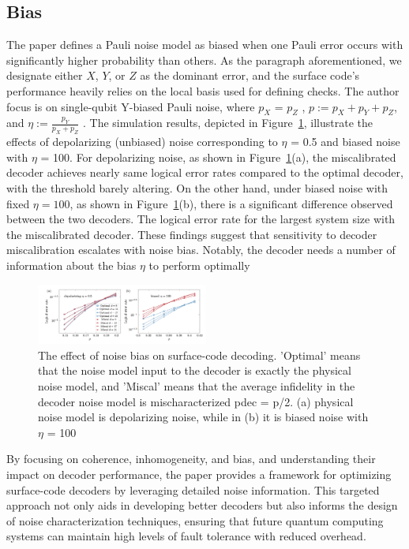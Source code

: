 \subsection{Bias}

The paper defines a Pauli noise model as biased when one Pauli error occurs with significantly higher probability than others. As the paragraph aforementioned, we designate either $X$, $Y$, or $Z$ as the dominant error, and the surface code's performance heavily relies on the local basis used for defining checks. The author focus is on single-qubit Y-biased Pauli noise, where $p_X$ = $p_Z$ , $p := p_X +p_Y +p_Z$, and $\eta := \frac{p_Y}{p_X + p_Z}$ . The simulation results, depicted in Figure~\ref{fig:eta}, illustrate the effects of depolarizing (unbiased) noise corresponding to $\eta$ = 0.5 and biased noise with $\eta$ = 100. For depolarizing noise, as shown in Figure~\ref{fig:eta}(a), the miscalibrated decoder achieves nearly same logical error rates compared to the optimal decoder, with the threshold barely altering. On the other hand, under biased noise with fixed $\eta = 100$, as shown in Figure~\ref{fig:eta}(b), there is a significant difference observed between the two decoders. The logical error rate for the largest system size with the miscalibrated decoder. These findings suggest that sensitivity to decoder miscalibration escalates with noise bias. Notably, the decoder needs a number of information about the bias $\eta$ to perform optimally
\begin{figure}[h]
    \centering
    \includegraphics[width=0.5\textwidth]{sections/3_decoder/eta.png}
    \caption{The effect of noise bias on surface-code decoding. 'Optimal' means that the noise model input to the decoder is exactly the physical noise model, and 'Miscal' means that the average infidelity in the decoder noise model is mischaracterized pdec = p/2. (a) physical noise model is depolarizing noise, while in (b) it is biased noise with $\eta$ = 100}
    \label{fig:eta}
\end{figure}

By focusing on coherence, inhomogeneity, and bias, and understanding their impact on decoder performance, the paper provides a framework for optimizing surface-code decoders by leveraging detailed noise information. This targeted approach not only aids in developing better decoders but also informs the design of noise characterization techniques, ensuring that future quantum computing systems can maintain high levels of fault tolerance with reduced overhead.